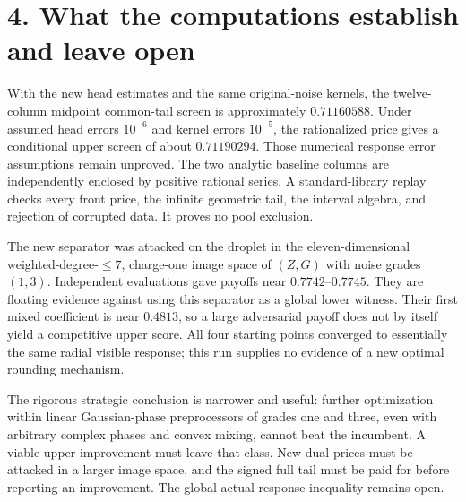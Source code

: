\documentclass[11pt]{article}
\begin{document}
\section*{4. What the computations establish and leave open}
With the new head estimates and the same original-noise kernels, the
twelve-column midpoint common-tail screen is approximately $0.71160588$.
Under assumed head errors $10^{-6}$ and kernel errors $10^{-5}$, the rationalized
price gives a conditional upper screen of about $0.71190294$. Those numerical
response error assumptions remain unproved. The two analytic baseline columns
are independently enclosed by positive rational series. A standard-library
replay checks every front price, the infinite geometric tail, the interval
algebra, and rejection of corrupted data. It proves no pool exclusion.

The new separator was attacked on the droplet in the eleven-dimensional
weighted-degree-$\le7$, charge-one image space of $(Z,G)$ with noise grades
$(1,3)$. Independent evaluations gave payoffs near $0.7742$--$0.7745$. They
are floating evidence against using this separator as a global lower witness.
Their first mixed coefficient is near $0.4813$, so a large adversarial payoff
does not by itself yield a competitive upper score. All four starting points
converged to essentially the same radial visible response; this run supplies no
evidence of a new optimal rounding mechanism.

The rigorous strategic conclusion is narrower and useful: further optimization
within linear Gaussian-phase preprocessors of grades one and three, even with
arbitrary complex phases and convex mixing, cannot beat the incumbent. A viable
upper improvement must leave that class. New dual prices must be attacked in a
larger image space, and the signed full tail must be paid for before reporting
an improvement. The global actual-response inequality remains open.
\end{document}
